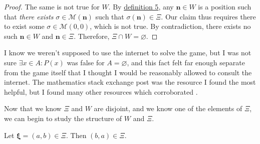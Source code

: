 \documentclass[11pt, letterpaper]{article}
\begin{document}
\begin{proof}
	The same is not true for $W$. By \hyperref[dfn:5]{definition 5}, any $\mathbf{n}\in W$ is a position such that \emph{there exists} $\sigma \in \mathscr{M} (\mathbf{n})$ such that $\sigma (\mathbf{n})\in \Xi $. Our claim thus requires there to exist some $\sigma \in \mathscr{M} (0,0)$, which is not true. By contradiction, there exists no such $\mathbf{n}\in W$ and $\mathbf{n}\in \Xi $. Therefore, $\Xi \cap W=\varnothing$.
\end{proof}
\begin{note}
	I know we weren't supposed to use the internet to solve the game, but I was not sure $\exists x\in A :P(x)$ was false for $A=\varnothing$, and this fact felt far enough separate from the game itself that I thought I would be reasonably allowed to consult the internet. The mathematics stack exchange post \cite{awa} was the resource I found the most helpful, but I found many other resources which corroborated \cite{awa}.
\end{note}
Now that we know $\Xi $ and $W$ are disjoint, and we know one of the elements of $\Xi $, we can begin to study the structure of $W$ and $\Xi $.
\begin{theorem}\label{thm:2}
	Let $\boldsymbol{\xi}= (a,b)\in \Xi $. Then $(b,a)\in \Xi $.
\end{theorem}
\end{document}
